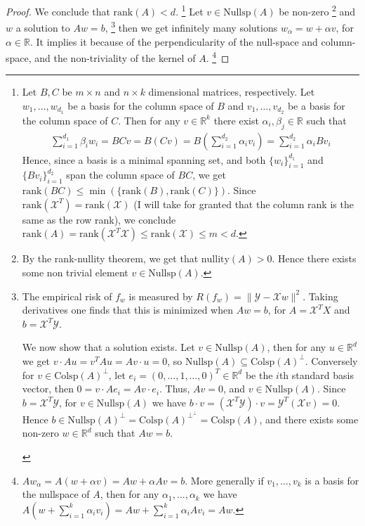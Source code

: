 \documentclass[12pt]{article}
\newcommand{\real}{\mathbb{R}}
\newcommand\set[1]{\{#1\}}
\newcommand\nullity{\text{nullity}}
\newcommand{\norm}[1]{\lVert #1 \rVert}
\newcommand{\X}{\mathcal{X}}
\newcommand{\Y}{\mathcal{Y}}
\newcommand{\colsp}{\text{Colsp}}
\newcommand{\nullsp}{\text{Nullsp}}
\newcommand{\rk}{\text{rank}}
\begin{document}
\begin{proof}

  We conclude that $\rk(A) < d$.
  \footnote{Let $B, C$ be $m \times n$ and $n \times k$ dimensional matrices, respectively. Let $w_1, \dots, w_{d_1}$ be a basis for the column space of $B$ and $v_1, \dots, v_{d_2}$ be a basis for the column space of $C$. Then for any $v \in \real^k$ there exist $\alpha_i, \beta_j \in \real$ such that
  \begin{align*}
   \sum\limits_{i=1}^{d_1}\beta_iw_i = BCv = B(Cv) =  B(\sum\limits_{i=1}^{d_2}\alpha_iv_i) = \sum\limits_{i=1}^{d_2}\alpha_iBv_i 
  \end{align*}
  Hence, since a basis is a minimal spanning set, and both $\set{w_i}_{i=1}^{d_1}$ and $\set{Bv_i}_{i=1}^{d_2}$  span the column space of $BC$, we get $\rk(BC) \leq \min(\set{\rk(B), \rk(C)})$. Since $\rk(\X^T) = \rk(\X)$ (I will take for granted that the column rank is the same as the row rank), we conclude $\rk(A) = \rk(\X^T\X) \leq \rk(\X) \leq m < d$.
  }
  Let $v \in \nullsp(A)$ be non-zero
  \footnote{
  By the rank-nullity theorem, we get that $\nullity(A)>0$. Hence there exists some non trivial element $ v \in \nullsp(A)$.
  }
  and $w$ a solution to $Aw=b$,
  \footnote{
  The empirical risk of $f_w$ is measured by $R(f_w) = \norm{\Y - \X w}^2$. Taking derivatives one finds that this is minimized when $Aw=b$, for $A=\X^T X$ and $b=\X^T \Y$. \\
  \begin{indent}
    We now show that a solution exists. Let $v \in \nullsp(A)$, then for any $u \in \real^d$ we get $v \cdot Au = v^T A u = Av \cdot u = 0$, so $\nullsp(A) \subseteq \colsp(A)^{\perp}$. Conversely for $v \in \colsp(A)^{\perp}$, let $e_i =(0, \dots, 1, \dots, 0)^T \in \real^d$ be the $i$th standard basis vector, then $0 = v \cdot Ae_i = Av \cdot e_i$. Thus, $Av = 0$, and $v \in \nullsp(A)$. Since $b=\X^T\Y$, for $v \in \nullsp(A)$ we have $b \cdot v = (\X^T \Y) \cdot v = \Y^T (\X v) = 0$. Hence $b \in \nullsp(A)^{\perp} = \colsp(A)^{\perp^\perp} = \colsp(A)$, and there exists some non-zero $w \in \real^d$ such that $Aw = b$.
  \end{indent}
  }
  then we get infinitely many solutions $w_{\alpha} = w + \alpha v$, for $\alpha \in \real$. It implies it because of the perpendicularity of the null-space and column-space, and the non-triviality of the kernel of $A$.
  \footnote{
  $Aw_{\alpha} = A(w + \alpha v) = Aw + \alpha Av = b$. More generally if $v_1, \dots, v_k$ is a basis for the nullspace of $A$, then for any $\alpha_1, \dots, \alpha_k$ we have
  $A(w+\sum\limits_{i=1}^k \alpha_iv_i) = Aw + \sum\limits_{i=1}^k \alpha_i Av_i = Aw$.
  }
\end{proof}
\end{document}
